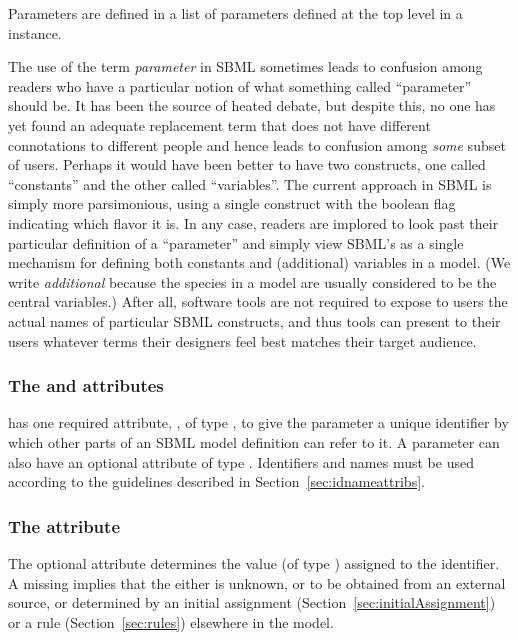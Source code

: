 Parameters are defined in a list of
parameters defined at the top level in a \Model
instance.

The use of the term \emph{parameter} in SBML sometimes leads to
confusion among readers who have a particular notion of what
something called ``parameter'' should be.  It has been the source
of heated debate, but despite this, no one has yet found an
adequate replacement term that does not have different
connotations to different people and hence leads to confusion
among \emph{some} subset of users.  Perhaps it would have been
better to have two constructs, one called ``constants'' and the
other called ``variables''.  The current approach in SBML is
simply more parsimonious, using a single \Parameter construct with
the boolean flag  indicating which flavor it is.
In any case, readers are implored to look past their particular
definition of a ``parameter'' and simply view SBML's \Parameter as
a single mechanism for defining both constants and (additional)
variables in a model.  (We write \emph{additional} because the
species in a model are usually considered to be the central
variables.)  After all, software tools are not required to expose
to users the actual names of particular SBML constructs, and thus
tools can present to their users whatever terms their designers
feel best matches their target audience.


\subsubsection{The  and  attributes}

\Parameter has one required attribute, , of type
, to give the parameter a unique identifier by which
other parts of an SBML model definition can refer to it.  A
parameter can also have an optional  attribute of type
.  Identifiers and names must be used according
to the guidelines described in Section~\ref{sec:idnameattribs}.


\subsubsection{The  attribute}
\label{sec:parameter-value}


The optional attribute  determines the value (of type
) assigned to the identifier.  A missing
 implies that the  either is unknown, or
to be obtained from an external source, or determined by an
initial assignment (Section~\ref{sec:initialAssignment}) or a rule
(Section~\ref{sec:rules}) elsewhere in the model.

